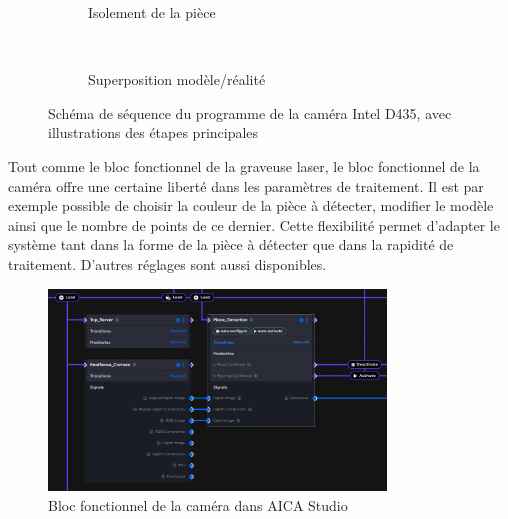 \begin{figure}[H]
\begin{minipage}{0.4\textwidth}
\begin{subfigure}{0.8\linewidth}
            \caption{Isolement de la pièce}
        \end{subfigure}\\[0.2cm]
        \begin{subfigure}{0.8\linewidth}
            \caption{Superposition modèle/réalité}
        \end{subfigure}
    \end{minipage}
    \caption{Schéma de séquence du programme de la caméra Intel D435, avec illustrations des étapes principales}
    \label{fig:sequence_camera_illustre}
\end{figure}

Tout comme le bloc fonctionnel de la graveuse laser, le bloc fonctionnel de la caméra offre une certaine liberté dans les paramètres de traitement. Il est par exemple possible de choisir la couleur de la pièce à détecter, modifier le modèle ainsi que le nombre de points de ce dernier. Cette flexibilité permet d'adapter le système tant dans la forme de la pièce à détecter que dans la rapidité de traitement. D'autres réglages sont aussi disponibles.

\begin{figure}[H]
    \centering
    \includegraphics[width=0.8\textwidth]{assets/figures/AICA_Camera.png}
    \caption{Bloc fonctionnel de la caméra dans AICA Studio}
    \label{fig:camera_interface}
\end{figure}

